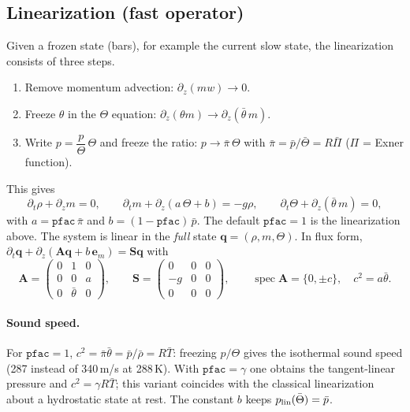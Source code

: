\documentclass[11pt,a4paper]{article}
\newcommand{\q}{\bm q}
\newcommand{\thb}{\bar\theta}
\newcommand{\pib}{\bar\pi}
\begin{document}
\subsection{Linearization (fast operator)}
Given a frozen state (bars), for example the current slow state, the linearization consists of
three steps.
\begin{enumerate}
\item Remove momentum advection: $\partial_z(mw)\to0$.
\item Freeze $\theta$ in the $\Theta$ equation: $\partial_z(\theta m)\to\partial_z(\thb\,m)$.
\item Write $p=\dfrac{p}{\Theta}\,\Theta$ and freeze the ratio: $p\to\pib\,\Theta$ with
      $\pib=\bar p/\bar\Theta=R\bar\Pi$ ($\Pi$ = Exner function).
\end{enumerate}
This gives
\begin{equation}\label{eq:fast}
\boxed{\;
\partial_t\rho+\partial_z m=0,\qquad
\partial_t m+\partial_z(a\,\Theta+b)=-g\rho,\qquad
\partial_t\Theta+\partial_z(\thb\,m)=0,\;}
\end{equation}
with $a=\texttt{pfac}\,\pib$ and $b=(1-\texttt{pfac})\,\bar p$. The default $\texttt{pfac}=1$ is
the linearization above. The system is linear in the \emph{full} state $\q=(\rho,m,\Theta)$. In
flux form, $\partial_t\q+\partial_z(\bm A\q+b\,\bm e_m)=\bm S\q$ with
\begin{equation}
\bm A=\begin{pmatrix}0&1&0\\0&0&a\\0&\thb&0\end{pmatrix},\qquad
\bm S=\begin{pmatrix}0&0&0\\-g&0&0\\0&0&0\end{pmatrix},\qquad
\operatorname{spec}\bm A=\{0,\pm c\},\quad c^2=a\thb .
\end{equation}

\paragraph{Sound speed.} For $\texttt{pfac}=1$, $c^2=\pib\thb=\bar p/\bar\rho=R\bar T$: freezing
$p/\Theta$ gives the isothermal sound speed (287 instead of 340\,m/s at 288\,K). With
$\texttt{pfac}=\gamma$ one obtains the tangent-linear pressure and $c^2=\gamma R\bar T$; this
variant coincides with the classical linearization about a hydrostatic state at rest. The
constant $b$ keeps $p_{\rm lin}(\bar\Theta)=\bar p$.
\end{document}
